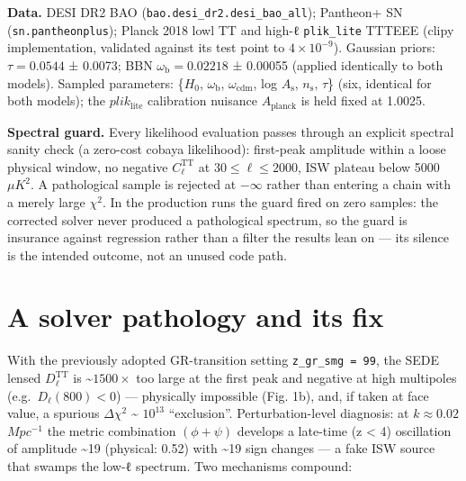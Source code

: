 \documentclass[preprint,12pt]{elsarticle}
\begin{document}
\textbf{Data.} DESI DR2 BAO \citep{DESI:2025zgx}
(\texttt{bao.\allowbreak desi\_\allowbreak dr2.\allowbreak desi\_\allowbreak bao\_\allowbreak all}); Pantheon+ SN
\citep{Brout:2022vxf} (\texttt{sn.\allowbreak pantheonplus}); Planck 2018 lowl TT
and high-ℓ \texttt{plik\_\allowbreak lite} TTTEEE \citep{Planck:2019nip} (clipy
implementation, validated against its test point to
\(4\times 10^{-9}\)). Gaussian priors: \(\tau  = 0.0544\) ± 0.0073; BBN
\(\omega _{\mathrm{b}} = 0.02218\) ± 0.00055 \citep{Schoneberg:2019wmt}
(applied identically to both models). Sampled parameters: \{\(H_{0}\),
\(\omega _{\mathrm{b}}\), \(\omega _{\mathrm{cdm}}\), log
\(A_{\mathrm{s}}\), \(n_{\mathrm{s}}\), \(\tau\)\} (six, identical for
both models); the \(plik_{\mathrm{lite}}\) calibration nuisance
\(A_{\mathrm{planck}}\) is held fixed at 1.0025.

\textbf{Spectral guard.} Every likelihood evaluation passes through an
explicit spectral sanity check (a zero-cost cobaya likelihood):
first-peak amplitude within a loose physical window, no negative
\(C_\ell ^\mathrm{TT}\) at \(30 \leq  \ell  \leq  2000\), ISW plateau
below 5000 \(\mu K^{2}\). A pathological sample is rejected at
\(-\infty\) rather than entering a chain with a merely large
\(\chi ^{2}\). In the production runs the guard fired on zero samples:
the corrected solver never produced a pathological spectrum, so the
guard is insurance against regression rather than a filter the results
lean on --- its silence is the intended outcome, not an unused code
path.

\section{A solver pathology and its fix}\label{sec-3}

With the previously adopted GR-transition setting
\texttt{z\_\allowbreak gr\_\allowbreak smg\ =\ 99}, the SEDE lensed \(D_\ell ^\mathrm{TT}\) is
\textasciitilde{}\(1500\times\) too large at the first peak and negative
at high multipoles (e.g.~\(D_\ell (800) < 0\)) --- physically impossible
(Fig. 1b), and, if taken at face value, a spurious \(\Delta \chi ^{2}\)
\textasciitilde{} \(10^{13}\) ``exclusion''. Perturbation-level
diagnosis: at \(k \approx  0.02\) \(Mpc^{-1}\) the metric combination
\((\phi +\psi )\) develops a late-time (z \textless{} 4) oscillation of
amplitude \textasciitilde19 (physical: 0.52) with \textasciitilde19 sign
changes --- a fake ISW source that swamps the low-ℓ spectrum. Two
mechanisms compound:
\end{document}
